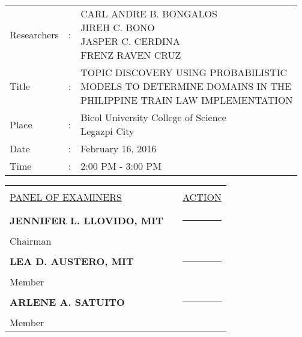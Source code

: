 \begin{spacing}{1}
\begin{flushleft}
\begin{tabular}{ l c l}
	\vspace{5mm}
        Researchers & : & \specialcell[t]{CARL ANDRE B. BONGALOS \\JIREH C. BONO \\
        JASPER C. CERDINA \\ FRENZ RAVEN CRUZ} \\ 
    \vspace{5mm}
        Title & : & \specialcell[t]{TOPIC DISCOVERY USING PROBABILISTIC  \\ MODELS TO DETERMINE DOMAINS IN THE \\ PHILIPPINE TRAIN LAW IMPLEMENTATION} \\
    \vspace{5mm}
        Place & : & \specialcell[t]{Bicol University College of Science \\ Legazpi City} \\
    \vspace{5mm}
        Date & : & February  16, 2016 \\
    \vspace{5mm}
        Time & : & 2:00 PM - 3:00 PM \\
\end{tabular}
\vspace{1cm}
    
\begin{tabular}{ l l c }
    \vspace{1cm}
        \uline{PANEL OF EXAMINERS} & \noindent \rule{4cm}{0pt} & \uline{ACTION} \\
        \textbf{JENNIFER L. LLOVIDO, MIT} & &
        \noindent \rule{3cm}{0.4pt} \\
    \vspace{5mm}
        Chairman & &  \\
        \textbf{LEA D. AUSTERO, MIT} & & \noindent\rule{3cm}{0.4pt} \\
    \vspace{5mm}
        Member & & \\
        \textbf{ARLENE A. SATUITO} & &  \noindent\rule{3cm}{0.4pt} \\
    \vspace{5mm}
        Member & & \\
\end{tabular}
\setlength{\tabcolsep}{10cm}

\end{flushleft}
\end{spacing}